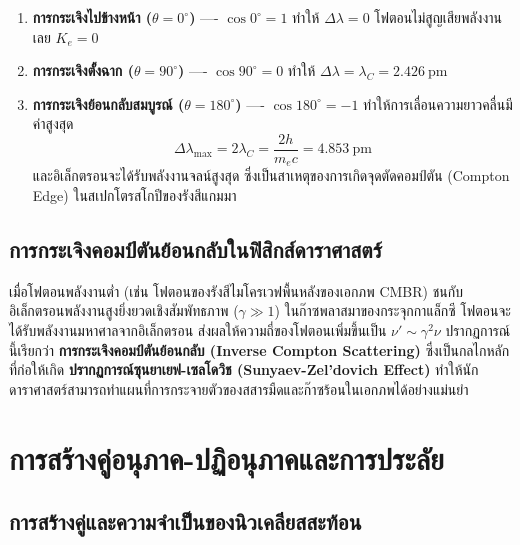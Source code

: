 \begin{enumerate}
    \item \textbf{การกระเจิงไปข้างหน้า ($\theta = 0^\circ$)} ---- $\cos 0^\circ = 1$ ทำให้ $\Delta\lambda = 0$ โฟตอนไม่สูญเสียพลังงานเลย $K_e = 0$
    \item \textbf{การกระเจิงตั้งฉาก ($\theta = 90^\circ$)} ---- $\cos 90^\circ = 0$ ทำให้ $\Delta\lambda = \lambda_C = 2.426~\text{pm}$
    \item \textbf{การกระเจิงย้อนกลับสมบูรณ์ ($\theta = 180^\circ$)} ---- $\cos 180^\circ = -1$ ทำให้การเลื่อนความยาวคลื่นมีค่าสูงสุด
    \begin{equation}
    \Delta\lambda_{\max} = 2\lambda_C = \frac{2h}{m_e c} = 4.853~\text{pm}
    \label{eq:max_compton_shift}
    \end{equation}
    และอิเล็กตรอนจะได้รับพลังงานจลน์สูงสุด ซึ่งเป็นสาเหตุของการเกิดจุดตัดคอมป์ตัน (Compton Edge) ในสเปกโตรสโกปีของรังสีแกมมา
\end{enumerate}

\subsection{การกระเจิงคอมป์ตันย้อนกลับในฟิสิกส์ดาราศาสตร์}

เมื่อโฟตอนพลังงานต่ำ (เช่น โฟตอนของรังสีไมโครเวฟพื้นหลังของเอกภพ CMBR) ชนกับอิเล็กตรอนพลังงานสูงยิ่งยวดเชิงสัมพัทธภาพ ($\gamma \gg 1$) ในก๊าซพลาสมาของกระจุกกาแล็กซี โฟตอนจะได้รับพลังงานมหาศาลจากอิเล็กตรอน ส่งผลให้ความถี่ของโฟตอนเพิ่มขึ้นเป็น $\nu' \sim \gamma^2 \nu$ ปรากฏการณ์นี้เรียกว่า \textbf{การกระเจิงคอมป์ตันย้อนกลับ (Inverse Compton Scattering)} ซึ่งเป็นกลไกหลักที่ก่อให้เกิด \textbf{ปรากฏการณ์ซุนยาเยฟ-เซลโดวิช (Sunyaev-Zel'dovich Effect)} ทำให้นักดาราศาสตร์สามารถทำแผนที่การกระจายตัวของสสารมืดและก๊าซร้อนในเอกภพได้อย่างแม่นยำ

\section{การสร้างคู่อนุภาค-ปฏิอนุภาคและการประลัย}

\subsection{การสร้างคู่และความจำเป็นของนิวเคลียสสะท้อน}

